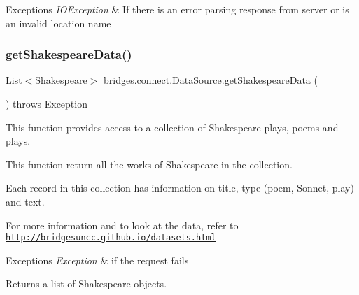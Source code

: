 \begin{DoxyExceptions}{Exceptions}
{\em I\+O\+Exception} & If there is an error parsing response from server or is an invalid location name \\
\hline
\end{DoxyExceptions}
\mbox{\label{classbridges_1_1connect_1_1_data_source_af2b6e5df074d0a689e8a992b1bea6f3e}} 
\subsubsection{\texorpdfstring{get\+Shakespeare\+Data()}{getShakespeareData()}\hspace{0.1cm}{\footnotesize\ttfamily [1/2]}}
{\footnotesize\ttfamily List$<$\hyperlink{classbridges_1_1data__src__dependent_1_1_shakespeare}{Shakespeare}$>$ bridges.\+connect.\+Data\+Source.\+get\+Shakespeare\+Data (\begin{DoxyParamCaption}{ }\end{DoxyParamCaption}) throws Exception}



This function provides access to a collection of Shakespeare plays, poems and plays. 

This function return all the works of Shakespeare in the collection.

Each record in this collection has information on title, type (poem, Sonnet, play) and text.

For more information and to look at the data, refer to \href{http://bridgesuncc.github.io/datasets.html}{\tt http\+://bridgesuncc.\+github.\+io/datasets.\+html}


\begin{DoxyExceptions}{Exceptions}
{\em Exception} & if the request fails\\
\hline
\end{DoxyExceptions}
\begin{DoxyReturn}{Returns}
a list of Shakespeare objects. 
\end{DoxyReturn}
\mbox{\label{classbridges_1_1connect_1_1_data_source_a04aa757c45139e52525d4b09156abfe1}} 
